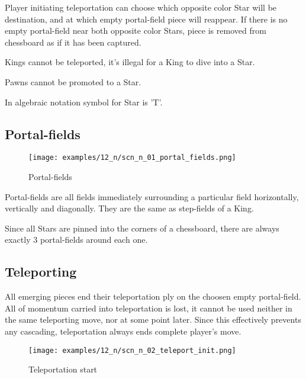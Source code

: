 Player initiating teleportation can choose which opposite color Star will be destination, and
at which empty portal-field piece will reappear. If there is no empty portal-field near both
opposite color Stars, piece is removed from chessboard as if it has been captured.

Kings cannot be teleported, it's illegal for a King to dive into a Star.

Pawns cannot be promoted to a Star.

In algebraic notation symbol for Star is 'T'.

\clearpage %

\subsection*{Portal-fields}

\noindent
\begin{wrapfigure}{l}{0.5\textwidth}
\centering
\texttt{[image: examples/12\_n/scn\_n\_01\_portal\_fields.png]}
\caption{Portal-fields}
\label{fig:scn_n_01_portal_fields}
\end{wrapfigure}
Portal-fields are all fields immediately surrounding a particular field
horizontally, vertically and diagonally. They are the same as step-fields
of a King.

Since all Stars are pinned into the corners of a chessboard, there are always
exactly 3 portal-fields around each one.

\subsection*{Teleporting}

All emerging pieces end their teleportation ply on the choosen empty
portal-field. All of momentum carried into teleportation is lost, it cannot
be used neither in the same teleporting move, nor at some point later.
Since this effectively prevents any cascading, teleportation always ends
complete player's move.

\clearpage %

\noindent
\begin{figure}[!h]
\texttt{[image: examples/12\_n/scn\_n\_02\_teleport\_init.png]}
\caption{Teleportation start}
\label{fig:scn_n_02_teleport_init}
\end{figure}

